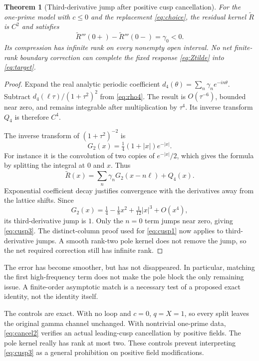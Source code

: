 \documentclass[11pt]{article}
\numberwithin{equation}{section}
\newtheorem{theorem}{Theorem}[section]
\theoremstyle{definition}
\theoremstyle{remark}
\begin{document}
\begin{theorem}[Third-derivative jump after positive cusp cancellation]
For the one-prime model with $c\le0$ and the replacement \eqref{eq:choice}, the residual kernel $\widetilde R$ is $C^2$ and satisfies
\begin{equation}
 \widetilde R'''(0+)-\widetilde R'''(0-)=\gamma_0<0.
 \label{eq:cusp3}
\end{equation}
Its compression has infinite rank on every nonempty open interval. No net finite-rank boundary correction can complete the fixed response \eqref{eq:Ztilde} into \eqref{eq:target}.
\end{theorem}
\begin{proof}
Expand the real analytic periodic coefficient $d_4(\theta)=\sum_n\gamma_ne^{-in\theta}$. Subtract
$d_4(\ell\tau)/(1+\tau^2)^2$ from \eqref{eq:rho4}. The result is $O(\tau^{-6})$, bounded near zero, and remains integrable after multiplication by $\tau^4$. Its inverse transform $Q_4$ is therefore $C^4$.

The inverse transform of $(1+\tau^2)^{-2}$ is
\begin{equation}
 G_2(x)=\tfrac14(1+|x|)e^{-|x|}.
\end{equation}
For instance it is the convolution of two copies of $e^{-|x|}/2$, which gives the formula by splitting the integral at $0$ and $x$. Thus
\begin{equation}
 \widetilde R(x)=\sum_n\gamma_nG_2(x-n\ell)+Q_4(x).
 \label{eq:decomp3}
\end{equation}
Exponential coefficient decay justifies convergence with the derivatives away from the lattice shifts. Since
\begin{equation}
 G_2(x)=\tfrac14-\tfrac18x^2+\tfrac1{12}|x|^3+O(x^4),
\end{equation}
its third-derivative jump is $1$. Only the $n=0$ term jumps near zero, giving \eqref{eq:cusp3}. The distinct-column proof used for \eqref{eq:cusp1} now applies to third-derivative jumps. A smooth rank-two pole kernel does not remove the jump, so the net required correction still has infinite rank.
\end{proof}
The error has become smoother, but has not disappeared. In particular, matching the first high-frequency term does not make the pole block the only remaining issue. A finite-order asymptotic match is a necessary test of a proposed exact identity, not the identity itself.

The controls are exact. With no loop and $c=0$, $q=X=1$, so every split leaves the original gamma channel unchanged. With nontrivial one-prime data, \eqref{eq:cancel2} verifies an actual leading-cusp cancellation by positive fields. The pole kernel really has rank at most two. These controls prevent interpreting \eqref{eq:cusp3} as a general prohibition on positive field modifications.
\end{document}
